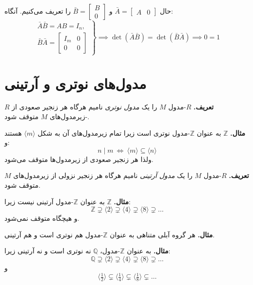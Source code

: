حال $\bar{A} = \begin{bmatrix} A & 0 \end{bmatrix}$ و $\bar{B} = \begin{bmatrix} B \\ 0 \end{bmatrix}$ را تعریف می‌کنیم. آنگاه:
\[
    \left.
    \begin{aligned}
        \bar{A} \bar{B} = AB = I_n, \\
        \bar{B} \bar{A} =
        \begin{bmatrix}
            I_m & 0 \\
            0   & 0
        \end{bmatrix}
    \end{aligned}
    \right\}
    \implies
    \det(\bar{A} \bar{B}) = \det(\bar{B} \bar{A}) \implies 0 = 1
\]



\section*{مدول‌های نوتری و آرتینی}

\textbf{تعریف.} $R$-مدول $M$ را یک \textit{مدول نوتری} نامیم هرگاه هر زنجیر صعودی از $R$-زیرمدول‌های $M$ متوقف شود.

\textbf{مثال.} $\mathbb{Z}$ به عنوان $\mathbb{Z}$-مدول نوتری است زیرا تمام زیرمدول‌های آن به شکل $\langle m \rangle$ هستند و:
\[
    n \mid m \ \Leftrightarrow\ \langle m \rangle \subseteq \langle n \rangle
\]
ولذا هر زنجیر صعودی از زیرمدول‌ها متوقف می‌شود.

\textbf{تعریف.} $R$-مدول $M$ را یک \textit{مدول آرتینی} نامیم هرگاه هر زنجیر نزولی از زیرمدول‌های $M$ متوقف شود.

\textbf{مثال.} $\mathbb{Z}$ به عنوان $\mathbb{Z}$-مدول آرتینی نیست زیرا:
\[
    \mathbb{Z} \supsetneq \langle 2 \rangle \supsetneq \langle 4 \rangle \supsetneq \langle 8 \rangle \supsetneq \dots
\]
و هیچگاه متوقف نمی‌شود.

\hrulefill

\textbf{مثال.} هر گروه آبلی متناهی به عنوان $\mathbb{Z}$-مدول هم نوتری است و هم آرتینی.

\textbf{مثال.} به عنوان $\mathbb{Z}$-مدول، $\mathbb{Q}$ نه نوتری است و نه آرتینی زیرا:
\[
    \mathbb{Q} \supsetneq \langle 2 \rangle \supsetneq \langle 4 \rangle \supsetneq \langle 8 \rangle \supsetneq \dots
\]
و
\[
    \langle \tfrac12 \rangle \subsetneq \langle \tfrac14 \rangle \subsetneq \langle \tfrac18 \rangle \subsetneq \dots
\]

